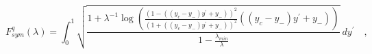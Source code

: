 \begin{equation}
F^q_{sym}(\lambda)=\int^{1}_{0}\sqrt{\frac{1+\lambda^{-1}
\log\left(\frac{(1-((y_c-y_-)y^\prime+y_-))^2}{(1+((y_c-y_-)y^\prime+y_-))^2}((y_c-y_-)y^\prime+y_-)\right)}{1-\frac{\lambda_{min}}{\lambda}}}~dy^\prime\quad,
\end{equation}

